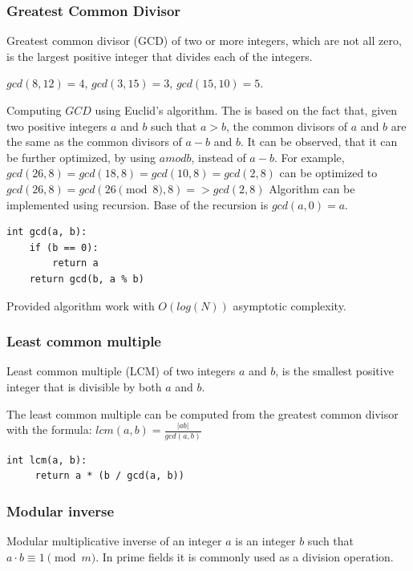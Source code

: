 \documentclass[../lecture-notes.tex]{subfiles}
\begin{document}
\subsubsection{Greatest Common Divisor}

Greatest common divisor (GCD) of two or more integers, which are not all zero, is the largest positive integer that divides each of the integers. 

\begin{example}
    $gcd(8, 12) = 4$, 
    $gcd(3, 15) = 3$, 
    $gcd(15, 10) = 5$.
\end{example}

Computing $GCD$ using Euclid's algorithm. 
The is based on the fact that, given two positive integers $a$ and $b$ such that $a > b$, 
the common divisors of $a$ and $b$ are the same as the common divisors of $a - b$ and $b$. 
It can be observed, that it can be further optimized, by using $a mod b$, instead of $a - b$. 
For example, $gcd(26, 8) = gcd(18, 8) = gcd(10, 8) = gcd(2, 8)$ can be optimized to $gcd(26, 8) = gcd(26 \pmod{8}, 8) => gcd(2, 8)$
Algorithm can be implemented using recursion. Base of the recursion is $gcd(a, 0) = a$.

\begin{lstlisting}[]
   int gcd(a, b):
    if (b == 0):
        return a
    return gcd(b, a % b)
\end{lstlisting}

Provided algorithm work with $O(log(N))$ asymptotic complexity.

\subsubsection{Least common multiple}

Least common multiple (LCM) of two integers $a$ and $b$, is the smallest positive integer that is divisible by both $a$ and $b$.

The least common multiple can be computed from the greatest common divisor with the formula:
$lcm(a, b) = \frac{|ab|}{gcd(a,b)}$

\begin{lstlisting}[]
    int lcm(a, b):
     return a * (b / gcd(a, b))
 \end{lstlisting}

 \subsubsection{Modular inverse}

Modular multiplicative inverse of an integer $a$ is an integer $b$ such that $a \cdot b \equiv 1 \pmod{m}$. 
In prime fields it is commonly used as a division operation.
\end{document}
